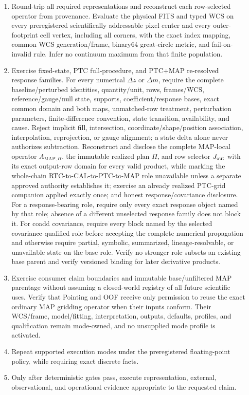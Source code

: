 \documentclass[10pt]{article}
\begin{document}
\begin{enumerate}
\item Round-trip all required representations and reconstruct each
row-selected operator from provenance. Evaluate the physical FITS and typed
WCS on every preregistered scientifically addressable pixel center and every
outer-footprint cell vertex, including all corners, with the exact index
mapping, common WCS generation/frame, binary64 great-circle metric, and
fail-on-invalid rule. Infer no continuum maximum from that finite population.
\item Exercise fixed-state, PTC full-procedure, and PTC+MAP re-resolved
response families. For every numerical \(\Delta z\) or \(\Delta m\), require
the complete baseline/perturbed identities, quantity/unit, rows, frames/WCS,
reference/gauge/null state, supports, coefficient/response bases, exact common
domain and both maps, unmatched-row treatment, perturbation parameters,
finite-difference convention, state transition, availability, and cause.
Reject implicit fill, intersection, coordinate/shape/position association,
interpolation, reprojection, or gauge alignment; a state delta alone never
authorizes subtraction. Reconstruct and disclose the complete MAP-local operator
\(A_{{\mathrm{MAP}},\Pi}\), the immutable realized plan \(\Pi\), and row
selector \(J_{\rm out}\) with its exact output-row domain for every valid
product, while
marking the whole-chain RTC-to-CAL-to-PTC-to-MAP role unavailable unless a
separate approved authority establishes it; exercise an already realized
PTC-grid companion applied exactly once; and honest response/covariance
disclosure. For a response-bearing role, require only every exact response
object named by that role; absence of a different unselected response family
does not block it. For coadd covariance, require
every block named by the selected covariance-qualified role before accepting the complete numerical propagation and
otherwise require partial, symbolic, summarized, lineage-resolvable, or
unavailable state on the base role. Verify no stronger role subsets an existing
base parent and verify versioned binding for later derivative products.
\item Exercise consumer claim boundaries and immutable base/unfiltered MAP
parentage without assuming a closed-world registry of all future scientific
uses.  Verify that Pointing and OOF receive only permission to reuse the exact
ordinary MAP gridding operator when their inputs conform.  Their WCS/frame,
model/fitting, interpretation, outputs, defaults, profiles, and qualification
remain mode-owned, and no unsupplied mode profile is activated.
\item Repeat supported execution modes under the preregistered floating-point
policy, while requiring exact discrete facts.
\item Only after deterministic gates pass, execute representation, external,
observational, and operational evidence appropriate to the requested claim.
\end{enumerate}
\end{document}
